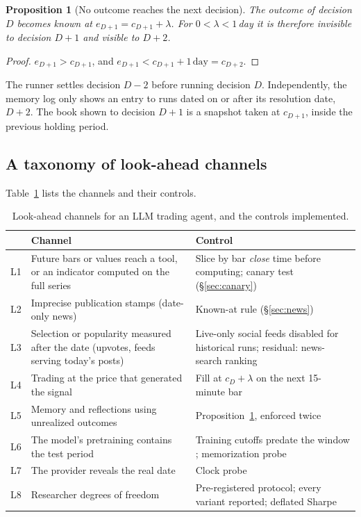 \documentclass[11pt]{article}
\newtheorem{proposition}{Proposition}
\theoremstyle{remark}
\begin{document}
\begin{proposition}[No outcome reaches the next decision]\label{prop:memory}
The outcome of decision $D$ becomes known at $e_{D+1}=c_{D+1}+\lambda$. For $0<\lambda<1$\,day it is therefore invisible to decision $D+1$ and visible to $D+2$.
\end{proposition}
\begin{proof}
$e_{D+1}>c_{D+1}$, and $e_{D+1}<c_{D+1}+1\,\text{day}=c_{D+2}$.
\end{proof}
The runner settles decision $D-2$ before running decision $D$. Independently, the memory log only shows an entry to runs dated on or after its resolution date, $D+2$. The book shown to decision $D+1$ is a snapshot taken at $c_{D+1}$, inside the previous holding period.

\subsection{A taxonomy of look-ahead channels}
Table~\ref{tab:leaks} lists the channels and their controls.

\begin{table}[t]\centering\small
\caption{Look-ahead channels for an LLM trading agent, and the controls implemented.}\label{tab:leaks}
\begin{tabularx}{\textwidth}{@{}lXX@{}}\toprule
 & Channel & Control\\\midrule
L1 & Future bars or values reach a tool, or an indicator computed on the full series & Slice by bar \emph{close} time before computing; canary test (\S\ref{sec:canary})\\
L2 & Imprecise publication stamps (date-only news) & Known-at rule (\S\ref{sec:news})\\
L3 & Selection or popularity measured after the date (upvotes, feeds serving today's posts) & Live-only social feeds disabled for historical runs; residual: news-search ranking\\
L4 & Trading at the price that generated the signal & Fill at $c_D+\lambda$ on the next 15-minute bar\\
L5 & Memory and reflections using unrealized outcomes & Proposition~\ref{prop:memory}, enforced twice\\
L6 & The model's pretraining contains the test period & Training cutoffs predate the window \citep{gpt6cutoffs}; memorization probe\\
L7 & The provider reveals the real date & Clock probe\\
L8 & Researcher degrees of freedom & Pre-registered protocol; every variant reported; deflated Sharpe\\\bottomrule
\end{tabularx}
\end{table}
\end{document}
